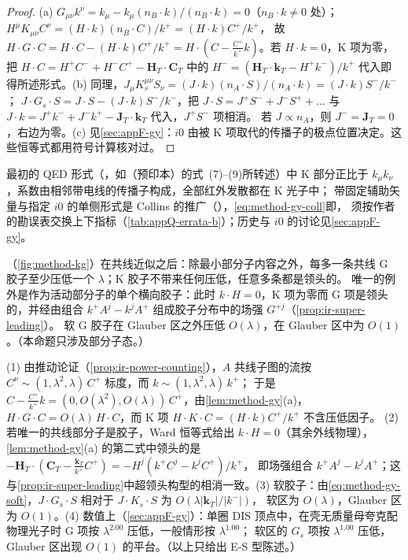\begin{proof}
(a) $G_{\mu\nu}k^\nu=k_\mu-k_\mu(n_B\cdot k)/(n_B\cdot k)=0$（$n_B\cdot k\neq0$ 处）；$H^\mu K_{\mu\nu}C^\nu=(H\cdot k)(n_B\cdot C)/k^+=(H\cdot k)C^+/k^+$，
故 $H\cdot G\cdot C=H\cdot C-(H\cdot k)C^+/k^+=H\cdot(C-\frac{C^+}{k^+}k)$。若 $H\cdot k=0$，K 项为零，把 $H\cdot C=H^+C^-+H^-C^+-\mathbf H_T\cdot\mathbf C_T$ 中的
$H^-=(\mathbf H_T\cdot\mathbf k_T-H^+k^-)/k^+$ 代入即得所述形式。(b) 同理，$J_\mu K_s^{\mu\nu}S_\nu=(J\cdot k)(n_A\cdot S)/(n_A\cdot k)=(J\cdot k)S^-/k^-$；
$J\cdot G_s\cdot S=J\cdot S-(J\cdot k)S^-/k^-$，把 $J\cdot S=J^+S^-+J^-S^++\ldots$ 与 $J\cdot k=J^+k^-+J^-k^+-\mathbf J_T\cdot\mathbf k_T$ 代入，$J^+S^-$ 项相消。
若 $J\propto n_A$，则 $J^-=\mathbf J_T=0$，右边为零。(c) 见\cref{sec:appF-gy}：$i0$ 由被 K 项取代的传播子的极点位置决定。这些恒等式都用符号计算核对过。%
\end{proof}

最初的 QED 形式（\cite{GrammerYennie1973}，如\cite{SenIndumathiChoudhury2019}（预印本）的式~(7)--(9)所转述）中 K 部分正比于 $k_\mu k_\nu$，系数由相邻带电线的传播子构成，全部红外发散都在 K 光子中；
带固定辅助矢量与指定 $i0$ 的单侧形式是 Collins 的推广（\cite[第~5.5.6、10.6、11.9.3~节]{Collins2011}），\cref{eq:method-gy-coll}即\cite[式~(11.4)--(11.6)，第~402~页]{Collins2011}，
须按作者的勘误表交换上下指标（\cref{tab:appQ-errata-b}）；历史与 $i0$ 的讨论见\cref{sec:appF-gy}。


\begin{proposition}\label{prop:method-gy-suppression}
（\cref{fig:method-kg}）在共线近似之后：除最小部分子内容之外，每多一条共线 G 胶子至少压低一个 $\lambda$；K 胶子不带来任何压低，任意多条都是领头的。
唯一的例外是作为活动部分子的单个横向胶子：此时 $k\cdot H=0$，K 项为零而 G 项是领头的，并经由组合 $k^+A^j-k^jA^+$ 组成胶子分布中的场强 $G^{+j}$（\cref{prop:ir-super-leading}）。
软 G 胶子在 Glauber 区之外压低 $O(\lambda)$，在 Glauber 区中为 $O(1)$。（本命题只涉及部分子态。）
\end{proposition}

\begin{proofsketch}
(1) 由推动论证（\cref{prop:ir-power-counting}），$A$ 共线子图的流按 $C^\nu\sim(1,\lambda^2,\lambda)\,C^+$ 标度，而 $k\sim(1,\lambda^2,\lambda)\,k^+$；
于是 $C-\frac{C^+}{k^+}k=(0,O(\lambda^2),O(\lambda))\,C^+$，由\cref{lem:method-gy}(a)，$H\cdot G\cdot C=O(\lambda)\,H\cdot C$，而 K 项 $H\cdot K\cdot C=(H\cdot k)C^+/k^+$ 不含压低因子。
(2) 若唯一的共线部分子是胶子，Ward 恒等式给出 $k\cdot H=0$（其余外线物理），\cref{lem:method-gy}(a) 的第二式中领头的是 $-\mathbf H_T\cdot(\mathbf C_T-\frac{\mathbf k_T}{k^+}C^+)=-H^j(k^+C^j-k^jC^+)/k^+$，
即场强组合 $k^+A^j-k^jA^+$；这与\cref{prop:ir-super-leading}中超领头构型的相消一致。(3) 软胶子：由\cref{eq:method-gy-soft}，$J\cdot G_s\cdot S$ 相对于 $J\cdot K_s\cdot S$ 为 $O(\lambda|\mathbf k_T|/|k^-|)$，
软区为 $O(\lambda)$，Glauber 区为 $O(1)$。(4) 数值上（\cref{sec:appF-gy}）：单圈 DIS 顶点中，在壳无质量母夸克配物理光子时 G 项按 $\lambda^{2.00}$ 压低，一般情形按 $\lambda^{1.00}$；
软区的 $G_s$ 项按 $\lambda^{1.00}$ 压低，Glauber 区出现 $O(1)$ 的平台。（以上只给出 E-S 型陈述。）
\end{proofsketch}

